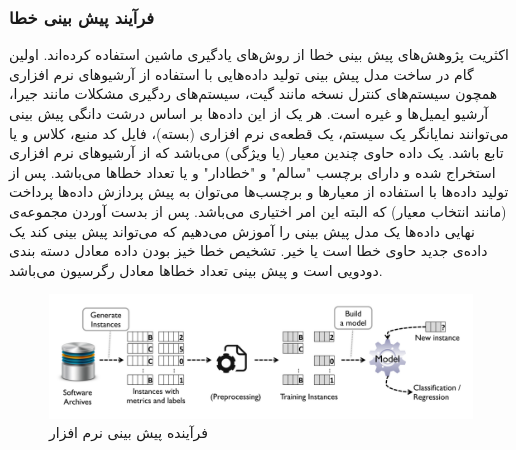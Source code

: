 \subsubsection{فرآیند پیش بینی خطا}
اکثریت پژوهش‌های پیش بینی خطا از روش‌های یادگیری ماشین  استفاده کرده‌اند. اولین گام در ساخت مدل پیش بینی تولید داده‌هایی با استفاده از آرشیو‌های نرم افزاری همچون سیستم‌های کنترل نسخه مانند گیت، سیستم‌های ردگیری مشکلات  مانند جیرا،  آرشیو ایمیل‌ها و غیره است. هر یک از این داده‌ها بر اساس درشت دانگی پیش بینی می‌توانند نمایانگر یک سیستم، یک قطعه‌ی نرم افزاری (بسته)، فایل کد منبع، کلاس و یا تابع باشد. یک داده حاوی چندین معیار (یا ویژگی) می‌باشد که از آرشیو‌های نرم افزاری استخراج شده و دارای برچسب "سالم" و "خطادار"  و یا تعداد خطاها می‌باشد. پس از تولید داده‌ها با استفاده از معیارها و برچسب‌ها می‌توان به پیش پردازش داده‌ها پرداخت (مانند انتخاب معیار) که البته این امر اختیاری می‌باشد. پس از بدست آوردن مجموعه‌ی نهایی داده‌ها یک مدل پیش بینی را آموزش می‌دهیم که می‌تواند پیش بینی کند یک داده‌ی جدید حاوی خطا است یا خیر. تشخیص خطا خیز بودن داده معادل دسته بندی دودویی است و پیش بینی تعداد خطاها معادل رگرسیون می‌باشد. 

\begin{figure}[H]
	\centering
	\includegraphics[width=1.0\textwidth]{images/prediction-process.PNG}
	 \caption{فرآینده پیش بینی نرم افزار \cite{nam2014survey}}
	\label{fig:prediction-process}
\end{figure}